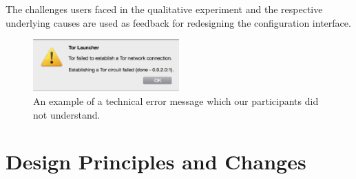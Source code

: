 \documentclass[USenglish,oneside,twocolumn]{article}
\begin{document}
{The challenges users faced in the qualitative experiment and the respective underlying causes are used as feedback for redesigning the configuration interface. 

\begin{figure}[t]
  \centering
    \includegraphics[width=0.5\textwidth]{error.png}
    \caption{An example of a technical error message which our participants did not understand.}
\label{fig:error}
\end{figure}

}

\section{Design Principles and Changes}
\label{redesign} 
\end{document}
